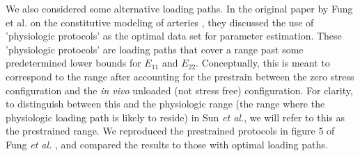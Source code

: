     We also considered some alternative loading paths. In the original paper by Fung et al. on the constitutive modeling of arteries \cite{fung_pseudoelasticity_1979}, they discussed the use of 'physiologic protocols' as the optimal data set for parameter estimation. These 'physiologic protocols' are loading paths that cover a range past some predetermined lower bounds for $E_{11}$ and $E_{22}$. Conceptually, this is meant to correspond to the range after accounting for the prestrain between the zero stress configuration and the \textit{in vivo} unloaded (not stress free) configuration. For clarity, to distinguish between this and the physiologic range (the range where the physiologic loading path is likely to reside) in Sun \textit{et al.}, we will refer to this as the prestrained range. We reproduced the prestrained protocols in figure 5 of Fung \textit{et al.} \cite{fung_pseudoelasticity_1979}, and compared the results to those with optimal loading paths. 






